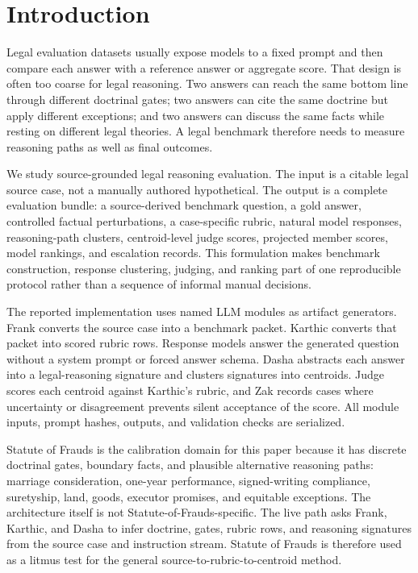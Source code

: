 \section{Introduction}

Legal evaluation datasets usually expose models to a fixed prompt and then
compare each answer with a reference answer or aggregate score. That design is
often too coarse for legal reasoning. Two answers can reach the same bottom line
through different doctrinal gates; two answers can cite the same doctrine but
apply different exceptions; and two answers can discuss the same facts while
resting on different legal theories. A legal benchmark therefore needs to
measure reasoning paths as well as final outcomes.

We study source-grounded legal reasoning evaluation. The input is a citable
legal source case, not a manually authored hypothetical. The output is a
complete evaluation bundle: a source-derived benchmark question, a gold answer,
controlled factual perturbations, a case-specific rubric, natural model
responses, reasoning-path clusters, centroid-level judge scores, projected
member scores, model rankings, and escalation records. This formulation makes
benchmark construction, response clustering, judging, and ranking part of one
reproducible protocol rather than a sequence of informal manual decisions.

The reported implementation uses named LLM modules as artifact generators.
Frank converts the source case into a benchmark packet. Karthic converts that
packet into scored rubric rows. Response models answer the generated question
without a system prompt or forced answer schema. Dasha abstracts each answer
into a legal-reasoning signature and clusters signatures into centroids. Judge
scores each centroid against Karthic's rubric, and Zak records cases where
uncertainty or disagreement prevents silent acceptance of the score. All module
inputs, prompt hashes, outputs, and validation checks are serialized.

Statute of Frauds is the calibration domain for this paper because it has
discrete doctrinal gates, boundary facts, and plausible alternative reasoning
paths: marriage consideration, one-year performance, signed-writing compliance,
suretyship, land, goods, executor promises, and equitable exceptions. The
architecture itself is not Statute-of-Frauds-specific. The live path asks Frank,
Karthic, and Dasha to infer doctrine, gates, rubric rows, and reasoning
signatures from the source case and instruction stream. Statute of Frauds is
therefore used as a litmus test for the general source-to-rubric-to-centroid
method.

